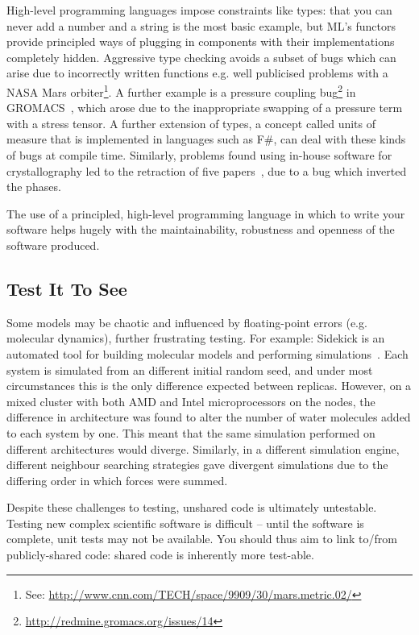 \documentclass[a4paper,11pt]{article}
\begin{document}
High-level programming languages impose constraints like types: that you can
never add a number and a string is the most basic example, but ML's
functors provide principled ways of plugging in components with their
implementations completely hidden. Aggressive type checking avoids a
subset of bugs which can arise due to incorrectly written functions
e.g. well publicised problems with a NASA Mars orbiter\footnote{See:
\url{http://www.cnn.com/TECH/space/9909/30/mars.metric.02/}}.  A
further example is a pressure coupling
bug\footnote{\url{http://redmine.gromacs.org/issues/14}} in
GROMACS~\cite{Hess2008}, which arose due to the inappropriate swapping
of a pressure term with a stress tensor.  A further extension of
types, a concept called units of measure that is implemented in
languages such as F\#, can deal with these kinds of bugs at compile
time. Similarly, problems found using in-house software for
crystallography led to the retraction of five
papers~\cite{Miller2006}, due to a bug which inverted the phases.

 The use of a
principled, high-level programming language in which to write your
software helps hugely with the maintainability, robustness and
openness of the software produced.

\subsection{Test It To See}

Some models may be chaotic and influenced by floating-point errors
(e.g. molecular dynamics), further frustrating testing. For example:
Sidekick is an automated tool for building molecular models and
performing simulations~\cite{Hall2014Sidekick}. Each system is
simulated from an different initial random seed, and under most
circumstances this is the only difference expected between
replicas. However, on a mixed cluster with both AMD and Intel
microprocessors on the nodes, the difference in architecture was found
to alter the number of water molecules added to each system by
one. This meant that the same simulation performed on different
architectures would diverge. Similarly, in a different simulation
engine, different neighbour searching strategies gave divergent
simulations due to the differing order in which forces were summed.

 Despite these
challenges to testing, unshared code is ultimately untestable.
Testing new complex scientific software is difficult -- until the
software is complete, unit tests may not be available. You should thus
aim to link to/from publicly-shared code: shared code is inherently more
test-able.
\end{document}
